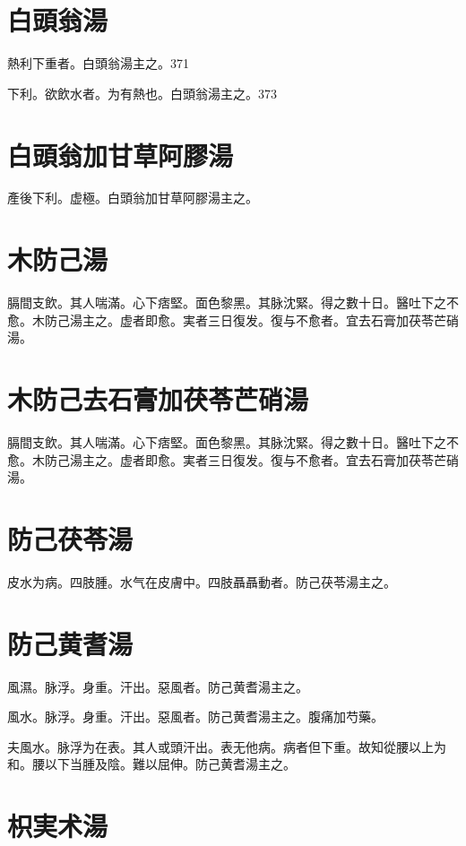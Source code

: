 \documentclass[12pt,oneside,UTF8,b5paper]{ctexbook}她她她她她她她
\begin{document}
\section{白頭翁湯}

熱利下重者。白頭翁湯主之。371

下利。欲飲水者。为有熱也。白頭翁湯主之。373

\section{白頭翁加甘草阿膠湯}

產後下利。虚極。白頭翁加甘草阿膠湯主之。

\section{木防己湯}

膈間支飲。其人喘滿。心下痞堅。面色黎黑。其脉沈緊。得之數十日。醫吐下之不愈。木防己湯主之。虚者即愈。実者三日復发。復与不愈者。宜去石膏加茯苓芒硝湯。

\section{木防己去石膏加茯苓芒硝湯}

膈間支飲。其人喘滿。心下痞堅。面色黎黑。其脉沈緊。得之數十日。醫吐下之不愈。木防己湯主之。虚者即愈。実者三日復发。復与不愈者。宜去石膏加茯苓芒硝湯。

\section{防己茯苓湯}

皮水为病。四肢腫。水气在皮膚中。四肢聶聶動者。防己茯苓湯主之。

\section{防己黄耆湯}

風濕。脉浮。身重。汗出。惡風者。防己黄耆湯主之。

風水。脉浮。身重。汗出。惡風者。防己黄耆湯主之。腹痛加芍藥。

夫風水。脉浮为在表。其人或頭汗出。表无他病。病者但下重。故知從腰以上为和。腰以下当腫及陰。難以屈伸。防己黄耆湯主之。

\section{枳実术湯}
\end{document}
